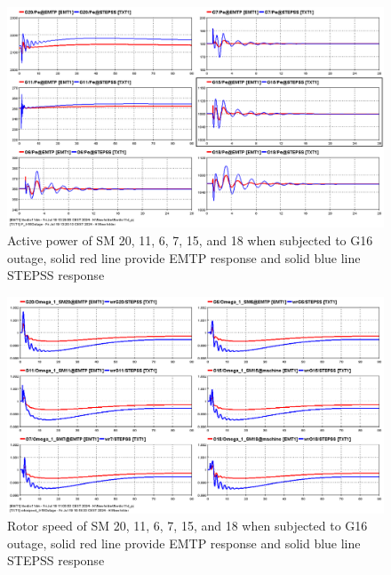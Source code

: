 \documentclass{report}
\begin{document}
\begin{figure}
    \centering
    \includegraphics[width=1\linewidth]{Figure_Nordic/Results/G16_Outage/Pe_G16_outage_SMAll.png}
    \caption{Active power of SM {20, 11, 6, 7, 15, and 18} when subjected to G16 outage, solid red line provide EMTP response and solid blue line STEPSS response}
    \label{fig:PeG16out}
\end{figure}
\begin{figure}
    \centering
    \includegraphics[width=1\linewidth]{Figure_Nordic/Results/G16_Outage/Wr100us.png}
    \caption{Rotor speed of SM {20, 11, 6, 7, 15, and 18} when subjected to G16 outage, solid red line provide EMTP response and solid blue line STEPSS response}
    \label{fig:wr100us}
\end{figure}
\end{document}
